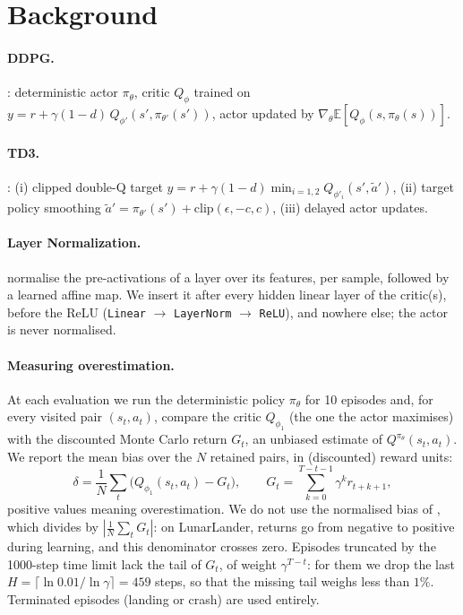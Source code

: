 \documentclass[10pt,a4paper]{article}
\newcommand{\E}{\mathbb{E}}
\newcommand{\Qphi}{Q_{\phi}}
\newcommand{\pith}{\pi_{\theta}}
\begin{document}
\section{Background}
\label{sec:background}
\paragraph{DDPG.} \citet{lillicrap2016ddpg}: deterministic actor $\pith$, critic $\Qphi$ trained on
$y = r + \gamma (1-d)\, Q_{\phi'}(s', \pi_{\theta'}(s'))$, actor updated by $\nabla_\theta \E[\Qphi(s,\pith(s))]$.

\paragraph{TD3.} \citet{fujimoto2018td3}: (i) clipped double-Q target
$y = r + \gamma (1-d) \min_{i=1,2} Q_{\phi'_i}(s', \tilde a')$, (ii) target policy smoothing
$\tilde a' = \pi_{\theta'}(s') + \mathrm{clip}(\epsilon, -c, c)$, (iii) delayed actor updates.

\paragraph{Layer Normalization.} \citet{ba2016layernorm} normalise the pre-activations of a layer over its features, per sample, followed by a learned affine map. We insert it after every hidden linear layer of the critic(s), before the ReLU (\texttt{Linear} $\to$ \texttt{LayerNorm} $\to$ \texttt{ReLU}), and nowhere else; the actor is never normalised.

\paragraph{Measuring overestimation.} At each evaluation we run the deterministic policy $\pith$ for 10 episodes and, for every visited pair $(s_t,a_t)$, compare the critic $Q_{\phi_1}$ (the one the actor maximises) with the discounted Monte Carlo return $G_t$, an unbiased estimate of $Q^{\pith}(s_t,a_t)$. We report the mean bias over the $N$ retained pairs, in (discounted) reward units:
\begin{equation}
  \delta = \frac{1}{N}\sum_{t} \big(Q_{\phi_1}(s_t,a_t) - G_t\big), \qquad
  G_t = \sum_{k=0}^{T-t-1} \gamma^k r_{t+k+1},
  \label{eq:bias}
\end{equation}
positive values meaning overestimation. We do not use the normalised bias of \citet{chen2021redq}, which divides by $|\frac1N\sum_t G_t|$: on LunarLander, returns go from negative to positive during learning, and this denominator crosses zero. Episodes truncated by the 1000-step time limit lack the tail of $G_t$, of weight $\gamma^{T-t}$: for them we drop the last $H=\lceil \ln 0.01/\ln\gamma\rceil = 459$ steps, so that the missing tail weighs less than $1\%$. Terminated episodes (landing or crash) are used entirely.
\end{document}
